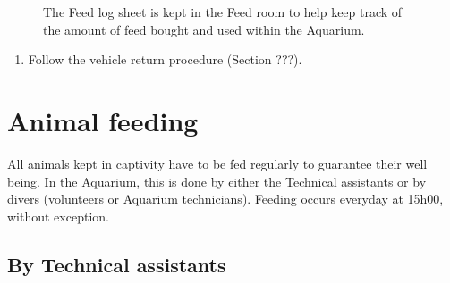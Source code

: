 \documentclass[
  letterpaper,
  DIV=11,
  numbers=noendperiod]{scrreprt}
\providecommand{\tightlist}{%
  \setlength{\itemsep}{0pt}\setlength{\parskip}{0pt}}\usepackage{longtable,booktabs,array}
\begin{document}
\begin{figure}[H]

\begin{minipage}[t]{0.50\linewidth}

{\centering 


}

\end{minipage}%
%
\begin{minipage}[t]{0.50\linewidth}

{\centering 


}

\end{minipage}%

\caption{\label{fig-feed-track}The Feed log sheet is kept in the Feed
room to help keep track of the amount of feed bought and used within the
Aquarium.}

\end{figure}

\begin{enumerate}
\def\labelenumi{\arabic{enumi}.}
\setcounter{enumi}{20}
\tightlist
\item
  Follow the vehicle return procedure (Section ???).
\end{enumerate}

\hypertarget{animal-feeding}{%
\section{Animal feeding}\label{animal-feeding}}

All animals kept in captivity have to be fed regularly to guarantee
their well being. In the Aquarium, this is done by either the Technical
assistants or by divers (volunteers or Aquarium technicians). Feeding
occurs everyday at 15h00, without exception.

\hypertarget{by-technical-assistants}{%
\subsection{By Technical assistants}\label{by-technical-assistants}}
\end{document}
